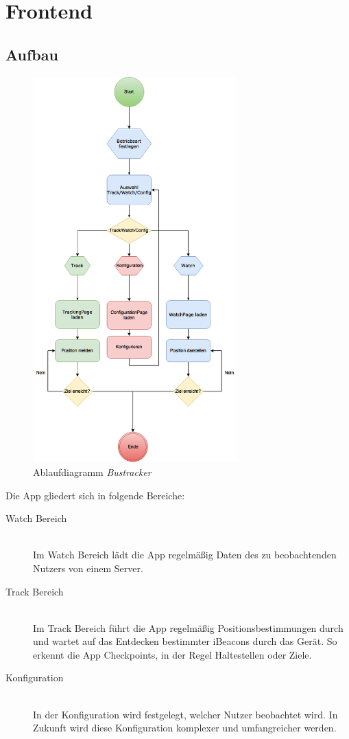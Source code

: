 \chapter{Frontend}
\label{Frontend}

\section{Aufbau}

\begin{figure}[htbp] 
  \centering
     \includegraphics[width=0.7\textwidth]{images/FlowChart_Bustracker.png} 
  \caption{Ablaufdiagramm \emph{Bustracker}}
  \label{fig:Ablaufdiagramm}
\end{figure}


Die App gliedert sich in folgende Bereiche:
\begin{description}
\item[Watch Bereich] \hfill \\
Im Watch Bereich lädt die App regelmäßig Daten des zu beobachtenden Nutzers von einem Server. 
\item[Track Bereich] \hfill \\
Im Track Bereich führt die App regelmäßig Positionsbestimmungen durch und wartet auf das Entdecken bestimmter iBeacons durch das Gerät. So erkennt die App Checkpoints, in der Regel Haltestellen oder Ziele. 
\item[Konfiguration] \hfill \\
In der Konfiguration wird festgelegt, welcher Nutzer beobachtet wird. In Zukunft wird diese Konfiguration komplexer und umfangreicher werden.
\end{description}


